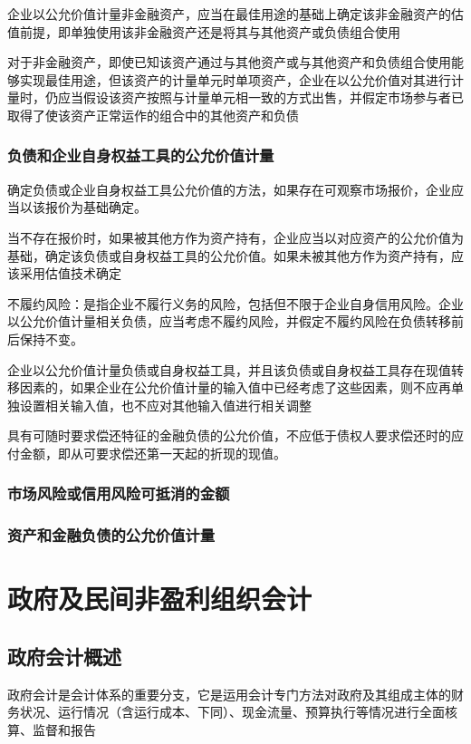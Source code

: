 \documentclass[UTF8,12pt]{ctexart}
\numberwithin{equation}{section} %
\numberwithin{figure}{section}
\numberwithin{table}{section}
\begin{document}
	企业以公允价值计量非金融资产，应当在最佳用途的基础上确定该非金融资产的估值前提，即单独使用该非金融资产还是将其与其他资产或负债组合使用
	
	对于非金融资产，即使已知该资产通过与其他资产或与其他资产和负债组合使用能够实现最佳用途，但该资产的计量单元时单项资产，企业在以公允价值对其进行计量时，仍应当假设该资产按照与计量单元相一致的方式出售，并假定市场参与者已取得了使该资产正常运作的组合中的其他资产和负债
	
	\subsubsection{负债和企业自身权益工具的公允价值计量}
	确定负债或企业自身权益工具公允价值的方法，如果存在可观察市场报价，企业应当以该报价为基础确定。
	
	当不存在报价时，如果被其他方作为资产持有，企业应当以对应资产的公允价值为基础，确定该负债或自身权益工具的公允价值。如果未被其他方作为资产持有，应该采用估值技术确定
	
	不履约风险：是指企业不履行义务的风险，包括但不限于企业自身信用风险。企业以公允价值计量相关负债，应当考虑不履约风险，并假定不履约风险在负债转移前后保持不变。
	
	企业以公允价值计量负债或自身权益工具，并且该负债或自身权益工具存在现值转移因素的，如果企业在公允价值计量的输入值中已经考虑了这些因素，则不应再单独设置相关输入值，也不应对其他输入值进行相关调整
	
	具有可随时要求偿还特征的金融负债的公允价值，不应低于债权人要求偿还时的应付金额，即从可要求偿还第一天起的折现的现值。
	\subsubsection{市场风险或信用风险可抵消的金额}
	\subsubsection{资产和金融负债的公允价值计量}
	
	\newpage
	
	\section{政府及民间非盈利组织会计}
	\subsection{政府会计概述}
	政府会计是会计体系的重要分支，它是运用会计专门方法对政府及其组成主体的财务状况、运行情况（含运行成本、下同）、现金流量、预算执行等情况进行全面核算、监督和报告
\end{document}
